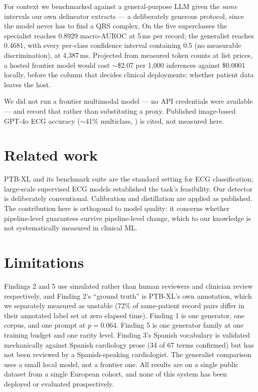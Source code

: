 \documentclass[pmlr,twocolumn,10pt]{jmlr}
\begin{document}
For context we benchmarked against a general-purpose LLM given the \emph{same} intervals our
own delineator extracts --- a deliberately generous protocol, since the model never has to
find a QRS complex. On the five superclasses the specialist reaches 0.8929 macro-AUROC at
5\,ms per record; the generalist reaches 0.4681, with every per-class confidence interval
containing 0.5 (no measurable discrimination), at 4{,}387\,ms. Projected from measured token
counts at list prices, a hosted frontier model would cost $\sim$\$2.07 per 1{,}000
inferences against \$0.0001 locally, before the column that decides clinical deployments:
whether patient data leaves the host.

We did not run a frontier multimodal model --- no API credentials were available --- and
record that rather than substituting a proxy. Published image-based GPT-4o ECG accuracy
($\sim$41\% multiclass, \citealp{zaboli2025gpt4o}) is cited, not measured here.

\section{Related work}

PTB-XL \citep{wagner2020ptbxl} and its benchmark suite \citep{strodthoff2021deep} are the
standard setting for ECG classification; large-scale supervised ECG models
\citep{ribeiro2020automatic} established the task's feasibility. Our detector is deliberately
conventional. Calibration \citep{guo2017calibration} and distillation
\citep{hinton2015distilling} are applied as published. The contribution here is orthogonal to
model quality: it concerns whether pipeline-level guarantees survive pipeline-level change,
which to our knowledge is not systematically measured in clinical ML.

\section{Limitations}

Findings 2 and 5 use simulated rather than human reviewers and clinician review
respectively, and Finding 2's ``ground truth'' is PTB-XL's own annotation, which we
separately measured as unstable (72\% of same-patient record pairs differ in their annotated
label set at zero elapsed time). Finding 1 is one generator, one corpus, and one prompt at
$p=0.064$. Finding 5 is one generator family at one training budget and one rarity level.
Finding 3's Spanish vocabulary is validated mechanically against Spanish cardiology prose
(34 of 67 terms confirmed) but has not been reviewed by a Spanish-speaking cardiologist. The
generalist comparison uses a small local model, not a frontier one. All results are on a
single public dataset from a single European cohort, and none of this system has been
deployed or evaluated prospectively.
\end{document}
